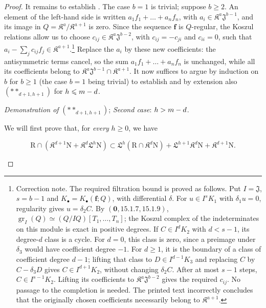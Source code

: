 \begin{proof}
It remains to establish . The case $b=1$ is trivial; suppose $b\geq2$. An element of the left-hand side is written $a_1f_1+\ldots+a_nf_n$, with $a_i\in\mathfrak K^a\mathfrak J^{b-1}$, and its image in $Q=\mathfrak K^a/\mathfrak K^{a+1}$ is zero. Since the sequence $\mathbf f$ is $Q$-regular, the Koszul relations allow us to choose $c_{ij}\in\mathfrak K^a\mathfrak J^{b-2}$, with $c_{ij}=-c_{ji}$ and $c_{ii}=0$, such that $a_i-\sum_j c_{ij}f_j\in\mathfrak K^{a+1}$.\footnote{Correction note. The required filtration bound is proved as follows. Put $I=\mathfrak J$, $s=b-1$ and $K_\bullet=K_\bullet(\mathbf f;Q)$, with differential $\delta$. For $u\in I^sK_1$ with $\delta_1u=0$, regularity gives $u=\delta_2C$. By $(\mathbf{0},15.1.7,15.1.9)$, $\operatorname{gr}_I(Q)\simeq(Q/IQ)[T_1,\ldots,T_n]$; the Koszul complex of the indeterminates on this module is exact in positive degrees. If $C\in I^dK_2$ with $d<s-1$, its degree-$d$ class is a cycle. For $d=0$, this class is zero, since a preimage under $\delta_3$ would have coefficient degree $-1$. For $d\geq1$, it is the boundary of a class of coefficient degree $d-1$; lifting that class to $D\in I^{d-1}K_3$ and replacing $C$ by $C-\delta_3D$ gives $C\in I^{d+1}K_2$, without changing $\delta_2C$. After at most $s-1$ steps, $C\in I^{s-1}K_2$. Lifting its coefficients to $\mathfrak K^a\mathfrak J^{b-2}$ gives the required $c_{ij}$. No passage to the completion is needed. The printed text incorrectly concludes that the originally chosen coefficients necessarily belong to $\mathfrak K^{a+1}$.} Replace the $a_i$ by these new coefficients: the antisymmetric terms cancel, so the sum $a_1f_1+\ldots+a_nf_n$ is unchanged, while all its coefficients belong to $\mathfrak K^a\mathfrak J^{b-1}\cap\mathfrak K^{a+1}$. It now suffices to argue by
induction on $b$ for $b\geqslant 1$ (the case $b=1$ being trivial) to establish  and by extension also $(**_{d+1,h+1})$ for $h\leqslant m- d$.

\begin{env}[19.7.1.18]
\label{IV.19.7.1.18}
\emph{Demonstration of} $(**_{d+1,h+1})$; \emph{Second case}: $h>m- d$.

We will first prove that, for \emph{every} $h\geqslant 0$, we have
\end{env}
\begin{env}[19.7.1.19]
\label{IV.19.7.1.19}
\[
  \mathrm{R}\cap(\mathfrak{K}^{d+1}\mathrm{N}+\mathfrak K^d\mathfrak{L}^h\mathrm{N})\subset\mathfrak{L}^h(\mathrm{R}\cap\mathfrak{K}^d\mathrm{N})+\mathfrak{L}^{h+1}\mathfrak{K}^d\mathrm{N}+\mathfrak K^{d+1}\mathrm{N}.
\]
\end{env}


\end{proof}
